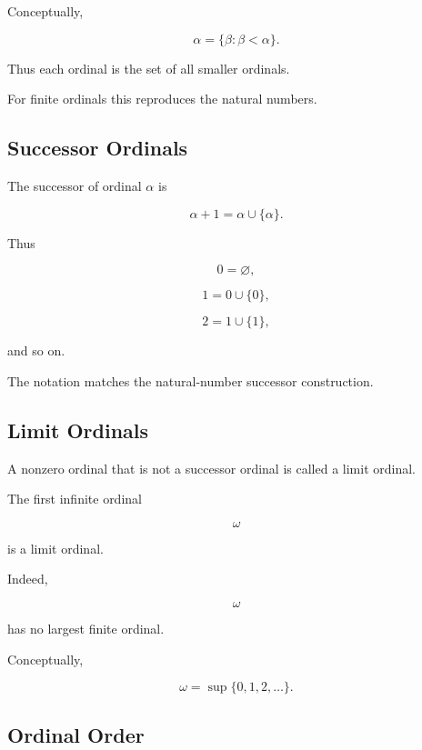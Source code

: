 Conceptually,

\[
\boxed{
\alpha
=
\{\beta:\beta<\alpha\}.
}
\]

Thus each ordinal is the set of all smaller ordinals.

For finite ordinals this reproduces the natural numbers.

\subsection{Successor Ordinals}
\label{subsec:successor-ordinals}

The successor of ordinal \(\alpha\) is

\[
\boxed{
\alpha+1
=
\alpha\cup\{\alpha\}.
}
\]

Thus

\[
0=\varnothing,
\]

\[
1=0\cup\{0\},
\]

\[
2=1\cup\{1\},
\]

and so on.

The notation matches the natural-number successor construction.

\subsection{Limit Ordinals}
\label{subsec:limit-ordinals}

A nonzero ordinal that is not a successor ordinal is called a limit
ordinal.

The first infinite ordinal

\[
\boxed{
\omega
}
\]

is a limit ordinal.

Indeed,

\[
\omega
\]

has no largest finite ordinal.

Conceptually,

\[
\boxed{
\omega
=
\sup
\{0,1,2,\ldots\}.
}
\]

\subsection{Ordinal Order}
\label{subsec:ordinal-order}

